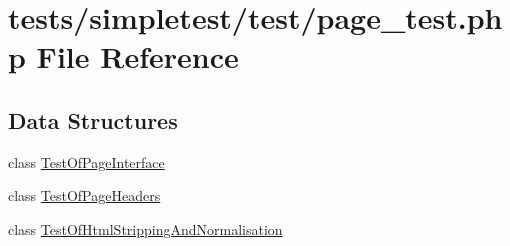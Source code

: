 \hypertarget{page__test_8php}{\section{tests/simpletest/test/page\-\_\-test.php File Reference}
\label{page__test_8php}
}
\subsection*{Data Structures}
\begin{DoxyCompactItemize}
\item 
class \hyperlink{class_test_of_page_interface}{Test\-Of\-Page\-Interface}
\item 
class \hyperlink{class_test_of_page_headers}{Test\-Of\-Page\-Headers}
\item 
class \hyperlink{class_test_of_html_stripping_and_normalisation}{Test\-Of\-Html\-Stripping\-And\-Normalisation}
\end{DoxyCompactItemize}
